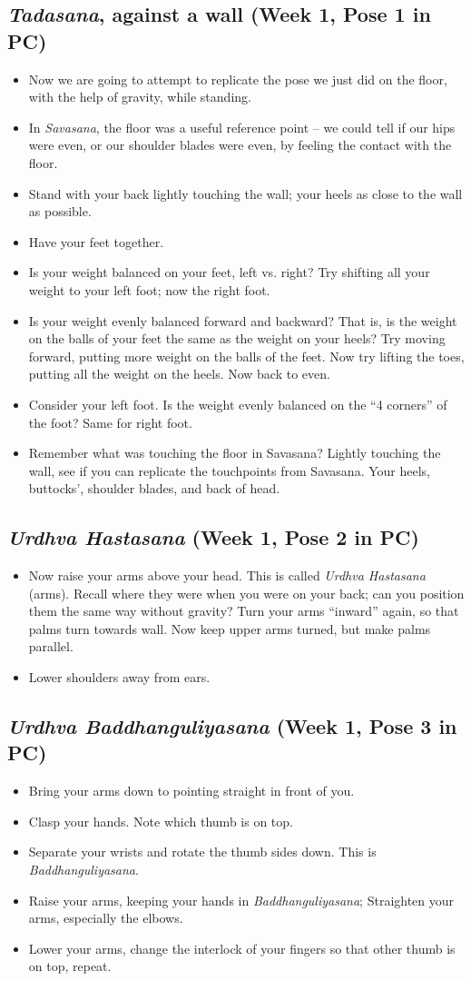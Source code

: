 \documentclass{book}
\newcommand{\apose}[1]{\emph{#1}}
\newcommand{\badd}{\apose{Baddhanguliyasana}}
\newcommand{\sav}{\apose{Savasana}}
\newcommand{\tad}{\apose{Tadasana}}
\newcommand{\urdbad}{\apose{Urdhva Baddhanguliyasana}}
\newcommand{\urdhast}{\apose{Urdhva Hastasana}}
\newcommand{\PC}[2]{{\normalfont \hfill(Week #1, Pose #2 in PC)}}
\newcommand{\newpose}[1]{{{#1}}}
\newcounter{pose}
\newcommand{\pose}{\subsection}
\begin{document}
\pose{\newpose{\tad{}}, against a wall \PC{1}{1}}

  \begin{itemize}
  \item Now we are going to attempt to replicate the pose we just did
    on the floor, with the help of gravity, while standing.
  \item In \sav{}, the floor was a useful reference point -- we
    could tell if our hips were even, or our shoulder blades were
    even, by feeling the contact with the floor.
  \item Stand with your back lightly touching the wall; your heels as
    close to the wall as possible.
  \item Have your feet together.
  \item Is your weight balanced on your feet, left vs. right? Try
    shifting all your weight to your left foot; now the right foot.
  \item Is your weight evenly balanced forward and backward? That is,
    is the weight on the balls of your feet the same as the weight on
    your heels? Try moving forward, putting more weight on the balls
    of the feet. Now try lifting the toes, putting all the weight on
    the heels. Now back to even.
  \item Consider your left foot. Is the weight evenly balanced on the
    ``4 corners'' of the foot? Same for right foot.
  \item Remember what was touching the floor in Savasana? Lightly
    touching the wall, see if you can replicate the touchpoints from
    Savasana. Your heels, buttocks', shoulder blades, and back of
    head.
  \end{itemize}

\pose{\newpose{\urdhast{}} \PC{1}{2}}

  \begin{itemize}
  \item Now raise your arms above your head. This is called \urdhast{}
    (arms). Recall where they were when you were on your back; can you
    position them the same way without gravity? Turn your arms
    ``inward'' again, so that palms turn towards wall. Now keep upper
    arms turned, but make palms parallel.
  \item Lower shoulders away from ears.
  \end{itemize}

\pose{\newpose{\urdbad{}} \PC{1}{3}}

  \begin{itemize}
  \item Bring your arms down to pointing straight in front of you.
  \item Clasp your hands. Note which thumb is on top. 
  \item Separate your wrists and rotate the thumb sides down. This is
    \badd{}.
  \item Raise your arms, keeping your hands in \badd{}; Straighten
    your arms, especially the elbows.
  \item Lower your arms, change the interlock of your fingers so that
    other thumb is on top, repeat.
  \end{itemize}
\end{document}
